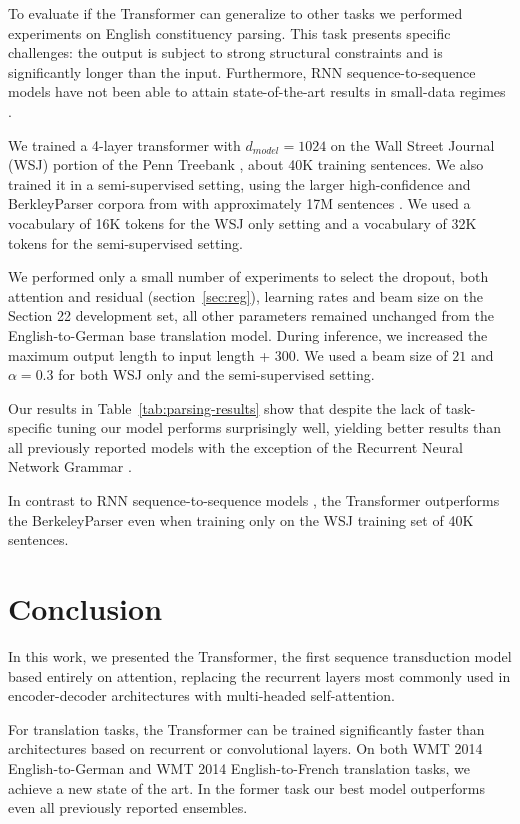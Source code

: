 \documentclass{article}
\begin{document}
To evaluate if the Transformer can generalize to other tasks we performed experiments on English constituency parsing. This task presents specific challenges: the output is subject to strong structural constraints and is significantly longer than the input.
Furthermore, RNN sequence-to-sequence models have not been able to attain state-of-the-art results in small-data regimes \cite{KVparse15}.

We trained a 4-layer transformer with $d_{model} = 1024$ on the Wall Street Journal (WSJ) portion of the Penn Treebank \citep{marcus1993building}, about 40K training sentences. We also trained it in a semi-supervised setting, using the larger high-confidence and BerkleyParser corpora from with approximately 17M sentences \citep{KVparse15}. We used a vocabulary of 16K tokens for the WSJ only setting and a vocabulary of 32K tokens for the semi-supervised setting.

We performed only a small number of experiments to select the dropout, both attention and residual (section~\ref{sec:reg}), learning rates and beam size on the Section 22 development set, all other parameters remained unchanged from the English-to-German base translation model. During inference, we increased the maximum output length to input length + $300$. We used a beam size of $21$ and $\alpha=0.3$ for both WSJ only and the semi-supervised setting.

Our results in Table~\ref{tab:parsing-results} show that despite the lack of task-specific tuning our model performs surprisingly well, yielding better results than all previously reported models with the exception of the Recurrent Neural Network Grammar \cite{dyer-rnng:16}.

In contrast to RNN sequence-to-sequence models \citep{KVparse15}, the Transformer outperforms the BerkeleyParser \cite{petrov-EtAl:2006:ACL} even when training only on the WSJ training set of 40K sentences.



\section{Conclusion}
In this work, we presented the Transformer, the first sequence transduction model based entirely on attention, replacing the recurrent layers most commonly used in encoder-decoder architectures with multi-headed self-attention.

For translation tasks, the Transformer can be trained significantly faster than architectures based on recurrent or convolutional layers. On both WMT 2014 English-to-German and WMT 2014 English-to-French translation tasks, we achieve a new state of the art. In the former task our best model outperforms even all previously reported ensembles. %
\end{document}
